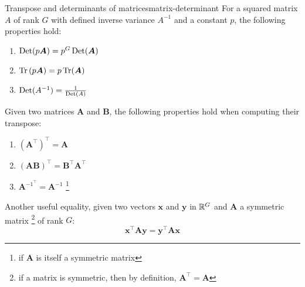 \begin{Property}{Transpose and determinants of matrices}{matrix-determinant}
For a squared matrix $A$ of rank $G$ with defined inverse variance $A^{-1}$ and a constant $p$, the following properties hold:
\begin{multicols}{3}
\begin{enumerate}[label=\emph{\alph*})]
\item $\operatorname*{Det}(p\boldsymbol{A})=p^G \operatorname*{Det} (\boldsymbol{A})$
\item $\operatorname*{Tr}\left(p \boldsymbol{A}\right)=p \operatorname*{Tr}(\boldsymbol{A})$
\item $\operatorname*{Det}(A^{-1})=\frac{1}{\operatorname*{Det}(A)}$
\end{enumerate}
\end{multicols}

Given two matrices $\boldsymbol{A}$ and $\boldsymbol{B}$, the following properties hold when computing their transpose:
\begin{multicols}{3}
\begin{enumerate}
    \item $(\boldsymbol{A}^\top)^\top=\boldsymbol{A}$
    \item $(\boldsymbol{A}\boldsymbol{B})^\top=\boldsymbol{B}^\top\boldsymbol{A}^\top$
    \item $\boldsymbol{A}^{{-1}^\top}=\boldsymbol{A}^{-1}$ \footnote{if $\boldsymbol{A}$ is itself a symmetric matrix}
\end{enumerate}
\end{multicols}

Another useful equality, given two vectors $\boldsymbol{x}$ and $\boldsymbol{y}$ in $\mathbb{R}^G$ and $\boldsymbol{A}$ a symmetric matrix \footnote{if a matrix is symmetric, then by definition, $\boldsymbol{A}^\top=\boldsymbol{A}$} of rank $G$:
\begin{equation*}
    \boldsymbol{x}^\top \boldsymbol{A} \boldsymbol{y} = \boldsymbol{y}^\top \boldsymbol{A} \boldsymbol{x}
\end{equation*}
\end{Property}




